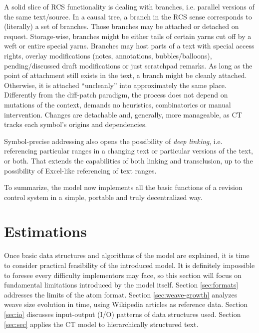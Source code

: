 \documentclass{sig-alternate}
\begin{document}

A solid slice of RCS functionality is dealing with branches, i.e. parallel versions of the same text/source.
In a causal tree, a branch in the RCS sense corresponds to (literally) a set of branches.
Those branches may be attached or detached on request.
Storage-wise, branches might be either tails of certain yarns cut off by a weft or entire special yarns.
Branches may host parts of a text with special access rights, overlay modifications (notes, annotations, bubbles/balloons), pending/discussed draft modifications or just scratchpad remarks.
As long as the point of attachment still exists in the text, a branch might be cleanly attached.
Otherwise, it is attached ``uncleanly'' into approximately the same place.
Differently from the diff-patch paradigm, the process does not depend on mutations of the context, demands no heuristics, combinatorics or manual intervention. Changes are detachable and, generally, more manageable, as CT tracks each symbol's origins and dependencies.

Symbol-precise addressing also opens the possibility of \emph{deep linking}, i.e. referencing particular ranges in a changing text or particular versions of the text, or both. That extends the capabilities of both linking and transclusion, up to the possibility of Excel-like referencing of text ranges.

To summarize, the model now implements all the basic functions of a revision control system in a simple, portable and truly decentralized way.

\section{Estimations} \label{sec:estim}

Once basic data structures and algorithms of the model are explained,
it is time to consider practical feasibility of the introduced model.
It is definitely impossible to foresee every difficulty implementors may face, so this section will focus on fundamental limitations introduced by the model itself.
Section \ref{sec:formats} addresses the limits of the atom format.
Section \ref{sec:weave-growth} analyzes weave size evolution in time, using Wikipedia articles as reference data.
Section \ref{sec:io} discusses input-output (I/O) patterns of data structures used.
Section \ref{sec:sec} applies the CT model to hierarchically structured text.
\end{document}
